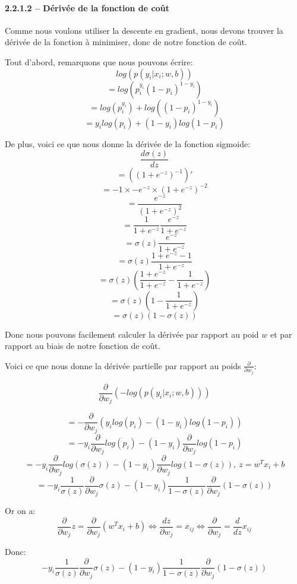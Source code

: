 \documentclass[
]{article}
\begin{document}
\hypertarget{duxe9rivuxe9e-de-la-fonction-de-couxfbt}{%
\paragraph{2.2.1.2 -- Dérivée de la fonction de
coût}\label{duxe9rivuxe9e-de-la-fonction-de-couxfbt}}

Comme nous voulons utiliser la descente en gradient, nous devons trouver
la dérivée de la fonction à minimiser, donc de notre fonction de coût.

Tout d'abord, remarquons que nous pouvons écrire:
\[log(p(y_i|x_i; w, b))\] \[= log(p_i^{y_i}(1 - p_i)^{1 - y_i})\]
\[= log(p_i^{y_i}) + log((1 - p_i)^{1 - y_i})\]
\[= y_i log(p_i) + (1 - y_i)log(1 - p_i)\]

De plus, voici ce que nous donne la dérivée de la fonction sigmoide:
\[\frac{d\sigma(z)}{dz}\] \[= ((1 + e^{-z})^{-1})'\]
\[= -1 \times - e ^{-z} \times (1 + e^{-z})^{-2}\]
\[=\frac{e^{-z}}{(1 + e^{-z})^2}\]
\[=\frac{1}{1 + e^{-z}}\frac{e^{-z}}{1 + e^{-z}}\]
\[= \sigma (z) \frac{e^{-z}}{1 + e^{-z}}\]
\[= \sigma (z) \frac{1 + e^{-z} - 1}{1 + e^{-z}}\]
\[= \sigma (z) (\frac{1 + e^{-z}}{1 + e^{-z}} - \frac{1}{1 + e^{-z}})\]
\[= \sigma (z) (1 - \frac{1}{1 + e^{-z}})\]
\[= \sigma (z) (1 - \sigma (z))\]

Donc nous pouvons facilement calculer la dérivée par rapport au poid
\(w\) et par rapport au biais de notre fonction de coût.

Voici ce que nous donne la dérivée partielle par rapport au poids
\(\frac{\partial}{\partial w_j}\):

\[\frac{\partial}{\partial w_j}\left(-log(p(y_i|x_i;w,b))\right)\]

\[=-\frac{\partial}{\partial w_j} (y_i log(p_i) - (1 - y_i)log(1 - p_i))\]
\[=-y_i \frac{\partial}{\partial w_j}log(p_i) - (1 - y_i)\frac{\partial}{\partial w_j}log(1 - p_i)\]
\[=-y_i \frac{\partial}{\partial w_j}log(\sigma (z)) - (1 - y_i)\frac{\partial}{\partial w_j}log(1 - \sigma (z)),\ z = w^T x_i + b\]
\[=-y_i \frac{1}{\sigma (z)}\frac{\partial}{\partial w_j}\sigma (z) - (1 - y_i)\frac{1}{1 - \sigma (z)}\frac{\partial}{\partial w_j}(1 - \sigma (z))\]

Or on a:
\[\frac{\partial}{\partial w_j} z = \frac{\partial}{\partial w_j}(w^T x_i + b) \Leftrightarrow \frac{dz}{\partial w_j} = x_{ij} \Leftrightarrow \frac{\partial}{\partial w_j} = \frac{d}{dz}x_{ij}\]

Donc:
\[-y_i \frac{1}{\sigma (z)}\frac{\partial}{\partial w_j}\sigma (z) - (1 - y_i)\frac{1}{1 - \sigma (z)}\frac{\partial}{\partial w_j}(1 - \sigma (z))\]
\end{document}
